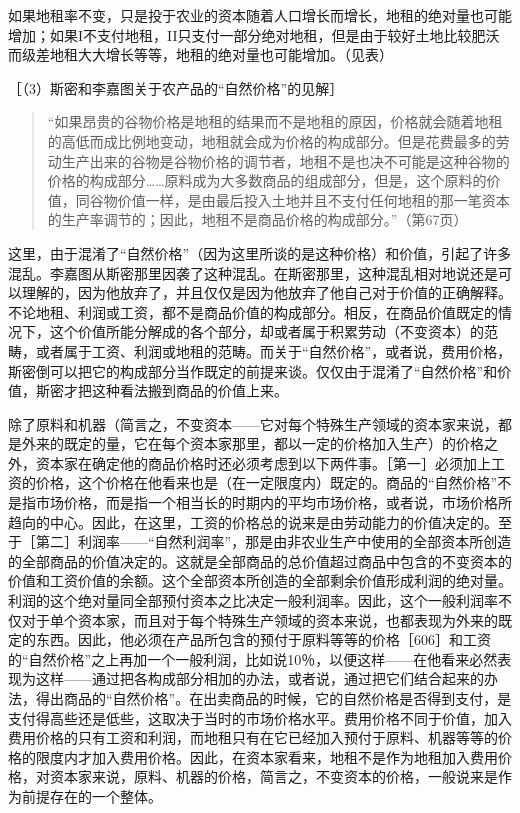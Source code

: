 如果地租率不变，只是投于农业的资本随着人口增长而增长，地租的绝对量也可能增加；如果I不支付地租，II只支付一部分绝对地租，但是由于较好土地比较肥沃而级差地租大大增长等等，地租的绝对量也可能增加。（见表）

［（3）斯密和李嘉图关于农产品的“自然价格”的见解］

\begin{quote}{“如果昂贵的谷物价格是地租的结果而不是地租的原因，价格就会随着地租的高低而成比例地变动，地租就会成为价格的构成部分。但是花费最多的劳动生产出来的谷物是谷物价格的调节者，地租不是也决不可能是这种谷物的价格的构成部分……原料成为大多数商品的组成部分，但是，这个原料的价值，同谷物价值一样，是由最后投入土地并且不支付任何地租的那一笔资本的生产率调节的；因此，地租不是商品价格的构成部分。”（第67页）}\end{quote}

这里，由于混淆了“自然价格”（因为这里所谈的是这种价格）和价值，引起了许多混乱。李嘉图从斯密那里因袭了这种混乱。在斯密那里，这种混乱相对地说还是可以理解的，因为他放弃了，并且仅仅是因为他放弃了他自己对于价值的正确解释。不论地租、利润或工资，都不是商品价值的构成部分。相反，在商品价值既定的情况下，这个价值所能分解成的各个部分，却或者属于积累劳动（不变资本）的范畴，或者属于工资、利润或地租的范畴。而关于“自然价格”，或者说，费用价格，斯密倒可以把它的构成部分当作既定的前提来谈。仅仅由于混淆了“自然价格”和价值，斯密才把这种看法搬到商品的价值上来。

除了原料和机器（简言之，不变资本——它对每个特殊生产领域的资本家来说，都是外来的既定的量，它在每个资本家那里，都以一定的价格加入生产）的价格之外，资本家在确定他的商品价格时还必须考虑到以下两件事。［第一］必须加上工资的价格，这个价格在他看来也是（在一定限度内）既定的。商品的“自然价格”不是指市场价格，而是指一个相当长的时期内的平均市场价格，或者说，市场价格所趋向的中心。因此，在这里，工资的价格总的说来是由劳动能力的价值决定的。至于［第二］利润率——“自然利润率”，那是由非农业生产中使用的全部资本所创造的全部商品的价值决定的。这就是全部商品的总价值超过商品中包含的不变资本的价值和工资价值的余额。这个全部资本所创造的全部剩余价值形成利润的绝对量。利润的这个绝对量同全部预付资本之比决定一般利润率。因此，这个一般利润率不仅对于单个资本家，而且对于每个特殊生产领域的资本来说，也都表现为外来的既定的东西。因此，他必须在产品所包含的预付于原料等等的价格［606］和工资的“自然价格”之上再加一个一般利润，比如说10％，以便这样——在他看来必然表现为这样——通过把各构成部分相加的办法，或者说，通过把它们结合起来的办法，得出商品的“自然价格”。在出卖商品的时候，它的自然价格是否得到支付，是支付得高些还是低些，这取决于当时的市场价格水平。费用价格不同于价值，加入费用价格的只有工资和利润，而地租只有在它已经加入预付于原料、机器等等的价格的限度内才加入费用价格。因此，在资本家看来，地租不是作为地租加入费用价格，对资本家来说，原料、机器的价格，简言之，不变资本的价格，一般说来是作为前提存在的一个整体。

